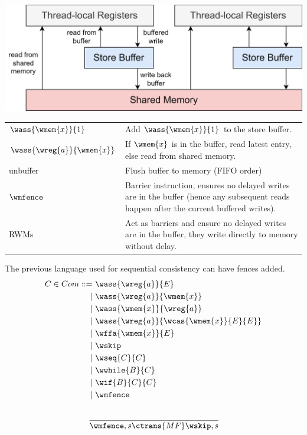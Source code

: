 \begin{center}
    \includegraphics[width=.8\textwidth]{operational_semantics/images/tso.drawio.png}
\end{center}
\begin{center}
    \begin{tabular}{l p{}}
        $\wass{\wmem{x}}{1}$ & Add $\wass{\wmem{x}}{1}$ to the store buffer. \\
        $\wass{\wreg{a}}{\wmem{x}}$ & If $\wmem{x}$ is in the buffer, read latest entry, else read from shared memory. \\
        unbuffer & Flush buffer to memory (FIFO order) \\
        $\wmfence$ & Barrier instruction, ensures no delayed writes are in the buffer (hence any subsequent reads happen after the current buffered writes). \\
        RWMs & Act as barriers and ensure no delayed writes are in the buffer, they write directly to memory without delay. \\
    \end{tabular}
\end{center}

The previous language used for sequential consistency can have fences added.
\[\begin{split}
    C \in Com ::= &\  \wass{\wreg{a}}{E} \\
    | & \  \wass{\wreg{a}}{\wmem{x}} \\
    | & \  \wass{\wmem{x}}{\wreg{a}} \\
    | & \  \wass{\wreg{a}}{\wcas{\wmem{x}}{E}{E}}\\
    | & \  \wffa{\wmem{x}}{E} \\
    | & \  \wskip \\
    | & \  \wseq{C}{C} \\
    | & \  \wwhile{B}{C} \\
    | & \  \wif{B}{C}{C} \\
    | & \  \wmfence \\
\end{split}\]

\[\cfrac{}{
        \wmfence, s \ctrans{MF} \wskip, s
    }\]

